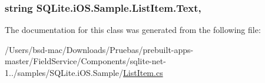 \hypertarget{class_s_q_lite_1_1i_o_s_1_1_sample_1_1_list_item_a3a3c892b53ce643b2862ca91b87bf4b7}{
\subsubsection[{Text}]{\setlength{\rightskip}{0pt plus 5cm}string S\+Q\+Lite.\+i\+O\+S.\+Sample.\+List\+Item.\+Text\hspace{0.3cm}{\ttfamily [get]}, {\ttfamily [set]}}}\label{class_s_q_lite_1_1i_o_s_1_1_sample_1_1_list_item_a3a3c892b53ce643b2862ca91b87bf4b7}


The documentation for this class was generated from the following file\+:\begin{DoxyCompactItemize}
\item 
/\+Users/bsd-\/mac/\+Downloads/\+Pruebas/prebuilt-\/apps-\/master/\+Field\+Service/\+Components/sqlite-\/net-\/1../samples/\+S\+Q\+Lite.\+i\+O\+S.\+Sample/\hyperlink{_s_q_lite_8i_o_s_8_sample_2_list_item_8cs}{List\+Item.\+cs}\end{DoxyCompactItemize}
